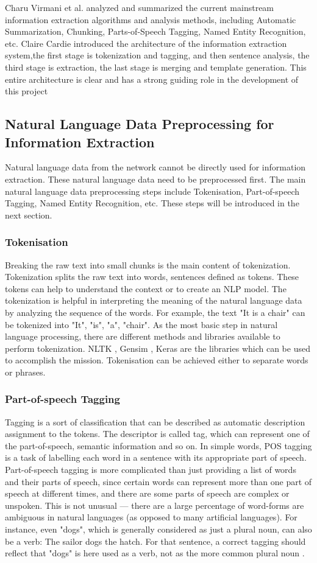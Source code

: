 Charu Virmani et al.\cite{virmani2017extracting} analyzed and summarized the current mainstream information extraction algorithms and analysis methods, including Automatic Summarization, Chunking, Parts-of-Speech Tagging, Named Entity Recognition, etc. Claire Cardie \cite{cardie1997empirical} introduced the architecture of the information extraction system,the first stage is tokenization and tagging, and then sentence analysis, the third stage is extraction, the last stage is merging and template generation. This entire architecture is clear and has a strong guiding role in the development of this project
\subsection{Natural Language Data Preprocessing for Information Extraction}
Natural language data from the network cannot be directly used for information extraction. These natural language data need to be preprocessed first. The main natural language data preprocessing steps include Tokenisation, Part-of-speech Tagging, Named Entity Recognition, etc. These steps will be introduced in the next section.
\subsubsection{Tokenisation}
\qquad Breaking the raw text into small chunks is the main content of tokenization. Tokenization splits the raw text into words, sentences defined as tokens. These tokens can help to understand the context or to create an NLP model. The tokenization is helpful in interpreting the meaning of the natural language data by analyzing the sequence of the words. For example, the text "It is a chair" can be tokenized into "It", "is", "a", "chair". As the most basic step in natural language processing, there are different methods and libraries available to perform tokenization. NLTK \cite{NLTK-doc}, Gensim \cite{gensim-doc}, Keras \cite{Keras-doc} are the libraries which can be used to accomplish the mission. Tokenisation can be achieved either to separate words or phrases. 
\subsubsection{Part-of-speech Tagging}
Tagging is a sort of classification that can be described as automatic description assignment to the tokens. The descriptor is called tag, which can represent one of the part-of-speech, semantic information and so on. In simple words, POS tagging is a task of labelling each word in a sentence with its appropriate part of speech. Part-of-speech tagging is more complicated than just providing a list of words and their parts of speech, since certain words can represent more than one part of speech at different times, and there are some parts of speech are complex or unspoken. This is not unusual — there are a large percentage of word-forms are ambiguous in natural languages (as opposed to many artificial languages). For instance, even "dogs", which is generally considered as just a plural noun, can also be a verb: The sailor dogs the hatch. For that sentence, a correct tagging should reflect that "dogs" is here used as a verb, not as the more common plural noun \cite{POS-wiki}.
